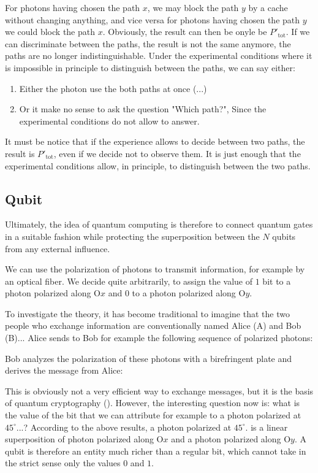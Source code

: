 	For photons having chosen the path $x$, we may block the path $y$ by a cache without changing anything, and vice versa for photons having chosen the path $y$ we could block the path $x$. Obviously, the result can then be onyle be ${P'}_\text{tot}$. If we can discriminate between the paths, the result is not the same anymore, the paths are no longer indistinguishable. Under the experimental conditions where it is impossible in principle to distinguish between the paths, we can say either:
	\begin{enumerate}
		\item Either the photon use the both paths at once (...)

		\item Or it make no sense to ask the question "Which path?", Since the experimental conditions do not allow to answer.
	\end{enumerate}
	It must be notice that if the experience allows to decide between two paths, the result is ${P'}_\text{tot}$, even if we decide not to observe them. It is just enough that the experimental conditions allow, in principle, to distinguish between the two paths.
	
	\subsection{Qubit}
	Ultimately, the idea of quantum computing is therefore to connect
quantum gates in a suitable fashion while protecting the superposition
between the $N$ qubits from any external influence.

We can use the polarization of photons to transmit information, for example by an optical fiber. We decide quite arbitrarily, to assign the value of $1$ bit to a photon polarized along O$x$ and $0$ to a photon polarized along O$y$.

	To investigate the theory, it has become traditional to imagine that the two people who exchange information are conventionally named Alice (A) and Bob (B)... Alice sends to Bob for example the following sequence of polarized photons:
	
	Bob analyzes the polarization of these photons with a birefringent plate and derives the message from Alice:
	
	This is obviously not a very efficient way to exchange messages, but it is the basis of quantum cryptography (). However, the interesting question now is: what is the value of the bit that we can attribute for example to a photon polarized at $45^\circ$...? According to the above results, a photon polarized at $45^\circ$. is a linear superposition of photon polarized along O$x$ and a photon polarized along O$y$. A qubit is therefore an entity much richer than a regular bit, which cannot take in the strict sense only the values $0$ and $1$.
	
